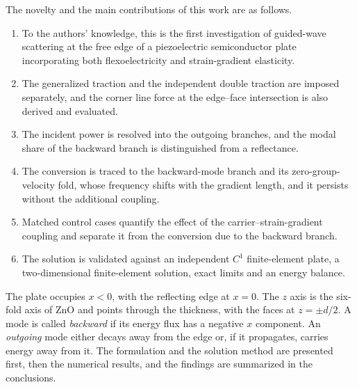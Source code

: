 The novelty and the main contributions of this work are as follows.
\begin{enumerate}\setlength{\itemsep}{0pt}\setlength{\parskip}{0pt}\setlength{\topsep}{2pt}
\item To the authors' knowledge, this is the first investigation of guided-wave scattering at the free edge of a piezoelectric semiconductor plate incorporating both flexoelectricity and strain-gradient elasticity.
\item The generalized traction and the independent double traction are imposed separately, and the corner line force at the edge--face intersection is also derived and evaluated.
\item The incident power is resolved into the outgoing branches, and the modal share of the backward branch is distinguished from a reflectance.
\item The conversion is traced to the backward-mode branch and its zero-group-velocity fold, whose frequency shifts with the gradient length, and it persists without the additional coupling.
\item Matched control cases quantify the effect of the carrier--strain-gradient coupling and separate it from the conversion due to the backward branch.
\item The solution is validated against an independent $C^{1}$ finite-element plate, a two-dimensional finite-element solution, exact limits and an energy balance.
\end{enumerate}

The plate occupies $x<0$, with the reflecting edge at $x=0$.  The $z$ axis is the six-fold axis of ZnO and points through the thickness, with the faces at $z=\pm d/2$.  A mode is called \emph{backward} if its energy flux has a negative $x$ component.  An \emph{outgoing} mode either decays away from the edge or, if it propagates, carries energy away from it.  The formulation and the solution method are presented first, then the numerical results, and the findings are summarized in the conclusions.
